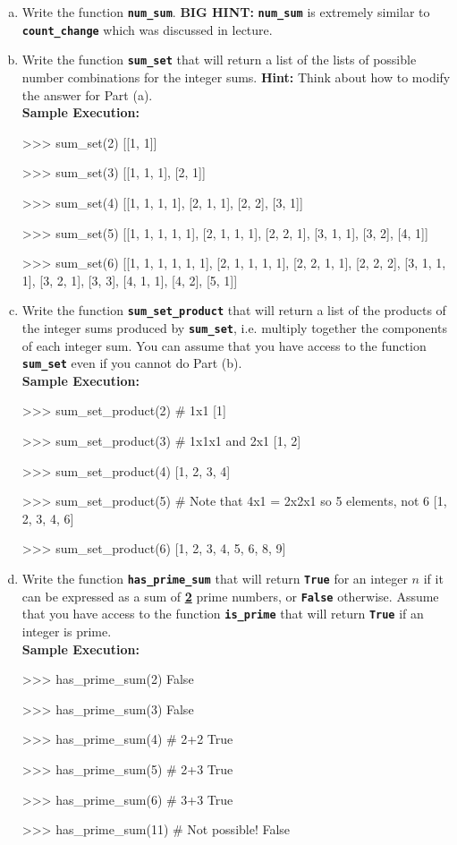 \begin{enumerate}[(a)]
\item Write the function \texttt{\bfseries num\_sum}. \textbf{BIG HINT:} \texttt{\bfseries num\_sum} is extremely 
similar to \texttt{\bfseries count\_change} which was discussed in lecture.

\item Write the function \texttt{\bfseries sum\_set} that will return a list of the lists of possible number 
combinations for the integer sums. \textbf{Hint:} Think about how to modify the answer for Part (a). \\
\textbf{Sample Execution:}
\begin{python}
>>> sum_set(2)
[[1, 1]]

>>> sum_set(3)
[[1, 1, 1], [2, 1]]

>>> sum_set(4)
[[1, 1, 1, 1], [2, 1, 1], [2, 2], [3, 1]]

>>> sum_set(5)
[[1, 1, 1, 1, 1], [2, 1, 1, 1], [2, 2, 1], [3, 1, 1], [3, 2],
[4, 1]]

>>> sum_set(6)
[[1, 1, 1, 1, 1, 1], [2, 1, 1, 1, 1], [2, 2, 1, 1], [2, 2, 2],
[3, 1, 1, 1], [3, 2, 1], [3, 3], [4, 1, 1], [4, 2], [5, 1]]
\end{python}

\item Write the function \texttt{\bfseries sum\_set\_product} that will return a list of the products of the integer
sums produced by \texttt{\bfseries sum\_set}, i.e. multiply together the components of each integer sum. You can
assume that you have access to the function \texttt{\bfseries sum\_set} even if you cannot do Part (b). \\
\textbf{Sample Execution:}
\begin{python}
>>> sum_set_product(2) # 1x1
[1]

>>> sum_set_product(3) # 1x1x1 and 2x1
[1, 2]

>>> sum_set_product(4)
[1, 2, 3, 4]

>>> sum_set_product(5) # Note that 4x1 = 2x2x1 so 5 elements, not 6
[1, 2, 3, 4, 6]

>>> sum_set_product(6)
[1, 2, 3, 4, 5, 6, 8, 9]
\end{python}

\item Write the function \texttt{\bfseries has\_prime\_sum} that will return \texttt{\bfseries True} for an 
integer $n$ if it can be expressed as a sum of \textbf{\underline{2}} prime numbers, or \texttt{\bfseries False} 
otherwise. Assume that you have access to the function \texttt{\bfseries is\_prime} that will return 
\texttt{\bfseries True} if an integer is prime. \\
\textbf{Sample Execution:}
\begin{python}
>>> has_prime_sum(2)
False

>>> has_prime_sum(3)
False

>>> has_prime_sum(4)    # 2+2
True

>>> has_prime_sum(5)    # 2+3
True

>>> has_prime_sum(6)    # 3+3
True

>>> has_prime_sum(11)   # Not possible!
False
\end{python}
\end{enumerate}
